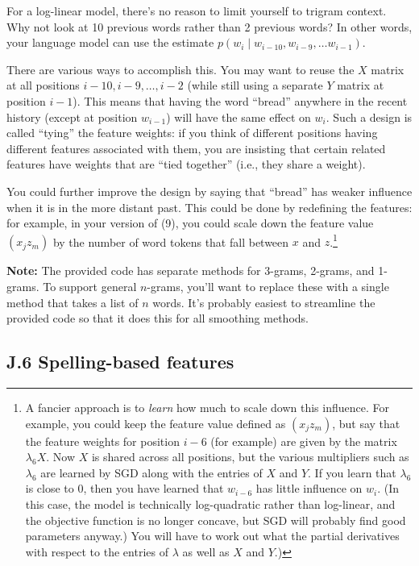 For a log-linear model, there’s no reason to limit yourself to trigram context. Why not look at 10 previous 
words rather than 2 previous words? In other words, your language model can use the estimate $p(w_i \mid w_{i-10}, w_{i-9}, \ldots w_{i-1})$. 

There are various ways to accomplish this. You may want to reuse the $X$ matrix at all positions $i-10, i-9, \ldots, i-2$ (while still using a separate $Y$ matrix at position $i-1$). This means that having the 
word “bread” anywhere in the recent history (except at position $w_{i-1}$) will have the same effect on $w_i$. Such 
a design is called “tying” the feature weights: if you think of different positions having different features 
associated with them, you are insisting that certain related features have weights that are “tied together” 
(i.e., they share a weight). 

You could further improve the design by saying that “bread” has weaker influence when it is in the more 
distant past. This could be done by redefining the features: for example, in your version of (9), you could 
scale down the feature value $(x_j z_m)$ by the number of word tokens that fall between $x$ and $z$.\footnote{A fancier approach is to \emph{learn} how much to scale down this influence. For example, you could keep the feature value defined as $(x_j z_m)$, but say that the feature weights for position $i-6$ (for example) are given by the matrix $\lambda_6 X$. Now $X$ is shared across all positions, but the various multipliers such as $\lambda_6$ are learned by SGD along with the entries of $X$ and $Y$. If you learn that $\lambda_6$ is close to 0, then you have learned that $w_{i-6}$ has little influence on $w_i$. (In this case, the model is technically log-quadratic rather than log-linear, and the objective function is no longer concave, but SGD will probably find good parameters anyway.) You will have to work out what the partial derivatives with respect to the entries of $\lambda$ as well as $X$ and $Y$.)}

\textbf{Note:} The provided code has separate methods for 3-grams, 2-grams, and 1-grams. To support general 
$n$-grams, you’ll want to replace these with a single method that takes a list of $n$ words. It’s probably easiest 
to streamline the provided code so that it does this for all smoothing methods. 

\subsection*{J.6 Spelling-based features}

